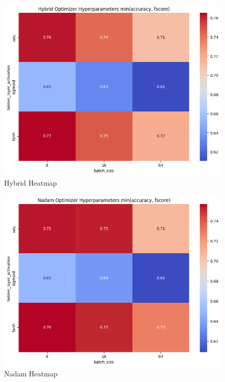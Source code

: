\documentclass[conference]{IEEEtran}
\begin{document}
\begin{figure}[htbp]
\centerline{\includegraphics[width=\columnwidth]{Fs HO GS HM acc.png}}
\caption{Hybrid Heatmap}
\label{fig}
\end{figure}

\newpage

\begin{figure}[htbp]
\centerline{\includegraphics[width=\columnwidth]{Fs Nadam GS HM acc.png}}
\caption{Nadam Heatmap}
\label{fig}
\end{figure}

\newpage
\end{document}
